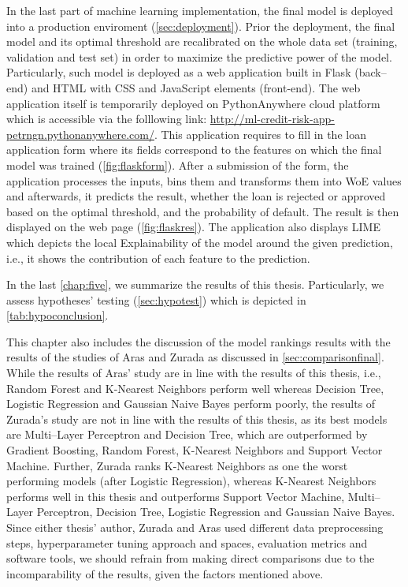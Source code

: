 In the last part of machine learning implementation, the final model is deployed into a production enviroment (\autoref{sec:deployment}).
Prior the deployment, the final model and its optimal threshold are recalibrated on the whole data set (training, validation and test set) in order to maximize the predictive power of the model.
Particularly, such model is deployed as a web application built in Flask (back--end) and HTML with CSS and JavaScript elements (front-end). The web application itself is temporarily deployed on PythonAnywhere cloud platform which is accessible via the folllowing link: \url{http://ml-credit-risk-app-petrngn.pythonanywhere.com/}.
This application requires to fill in the loan application form where its fields correspond to the features on which the final model was trained (\autoref{fig:flaskform}). After a submission of the form, the application processes the inputs, bins them and transforms them into WoE values and afterwards, it predicts the result, whether the loan is rejected or approved based on the optimal threshold, and the probability of default. The result is then displayed on the web page (\autoref{fig:flaskres}).
The application also displays LIME which depicts the local Explainability of the model around the given prediction, i.e., it shows the contribution of each feature to the prediction.

In the last \autoref{chap:five}, we summarize the results of this thesis. Particularly, we assess hypotheses' testing (\autoref{sec:hypotest}) which is depicted in  \autoref{tab:hypoconclusion}.

This chapter also includes the discussion of the model rankings results with the results of the studies of Aras \citep{serkan2021bagging} and Zurada \citep{zurada2014classification} as discussed in \autoref{sec:comparisonfinal}.
While the results of Aras' study are in line with the results of this thesis, i.e., Random Forest and K-Nearest Neighbors perform well whereas Decision Tree, Logistic Regression and Gaussian Naive Bayes perform poorly,
the results of Zurada's study are not in line with the results of this thesis, as its best models are Multi--Layer Perceptron and Decision Tree, which are outperformed by Gradient Boosting, Random Forest, K-Nearest Neighbors and Support Vector Machine.
Further, Zurada ranks K-Nearest Neighbors as one the worst performing models (after Logistic Regression), whereas K-Nearest Neighbors performs well in this thesis and outperforms Support Vector Machine, Multi--Layer Perceptron, Decision Tree, Logistic Regression and Gaussian Naive Bayes.
Since either thesis' author, Zurada and Aras used different data preprocessing steps, hyperparameter tuning approach and spaces, evaluation metrics and software tools, we should refrain from making direct comparisons due to the incomparability of the results, given the factors mentioned above.

